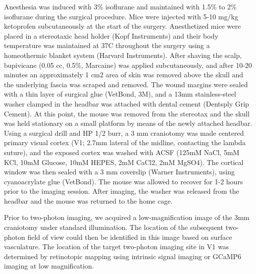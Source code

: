 \documentclass[10pt,letterpaper]{article}
\begin{document}
{Anesthesia was induced with 3\% isoflurane and maintained with 1.5\% to 2\% isoflurane during the surgical procedure. Mice were injected with 5-10 mg/kg ketoprofen subcutaneously at the start of the surgery. Anesthetized mice were placed in a stereotaxic head holder (Kopf Instruments) and their body temperature was maintained at 37C throughout the surgery using a homeothermic blanket system (Harvard Instruments). After shaving the scalp, bupivicane (0.05 cc, 0.5\%, Marcaine) was applied subcutaneously, and after 10-20 minutes an approximately 1 cm2 area of skin was removed above the skull and the underlying fascia was scraped and removed. The wound margins were sealed with a thin layer of surgical glue (VetBond, 3M), and a 13mm stainless-steel washer clamped in the headbar was attached with dental cement (Dentsply Grip Cement). At this point, the mouse was removed from the stereotax and the skull was held stationary on a small platform by means of the newly attached headbar. Using a surgical drill and HP 1/2 burr, a 3 mm craniotomy was made centered primary visual cortex (V1; 2.7mm lateral of the midline, contacting the lambda suture), and the exposed cortex was washed with ACSF (125mM NaCl, 5mM KCl, 10mM Glucose, 10mM HEPES, 2mM CaCl2, 2mM MgSO4). The cortical window was then sealed with a 3 mm coverslip (Warner Instruments), using cyanoacrylate glue (VetBond). The mouse was allowed to recover for 1-2 hours prior to the imaging session. After imaging, the washer was released from the headbar and the mouse was returned to the home cage. 


Prior to two-photon imaging, we acquired a low-magnification image of the 3mm craniotomy under standard illumination. The location of the subsequent two-photon field of view could then be identified in this image based on surface vasculature. The location of the target two-photon imaging site in V1 was determined by retinotopic mapping using intrinsic signal imaging or GCaMP6 imaging at low magnification.


}
\end{document}
